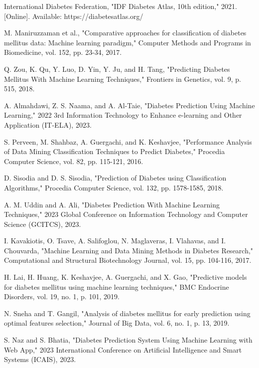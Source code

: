 \documentclass[journal]{IEEEtran}
\begin{document}
\begin{thebibliography}{00}
 International Diabetes Federation, "IDF Diabetes Atlas, 10th edition," 2021. [Online]. Available: https://diabetesatlas.org/

 M. Maniruzzaman et al., "Comparative approaches for classification of diabetes mellitus data: Machine learning paradigm," Computer Methods and Programs in Biomedicine, vol. 152, pp. 23-34, 2017.

 Q. Zou, K. Qu, Y. Luo, D. Yin, Y. Ju, and H. Tang, "Predicting Diabetes Mellitus With Machine Learning Techniques," Frontiers in Genetics, vol. 9, p. 515, 2018.

 A. Almahdawi, Z. S. Naama, and A. Al-Taie, "Diabetes Prediction Using Machine Learning," 2022 3rd Information Technology to Enhance e-learning and Other Application (IT-ELA), 2023.

 S. Perveen, M. Shahbaz, A. Guergachi, and K. Keshavjee, "Performance Analysis of Data Mining Classification Techniques to Predict Diabetes," Procedia Computer Science, vol. 82, pp. 115-121, 2016.

 D. Sisodia and D. S. Sisodia, "Prediction of Diabetes using Classification Algorithms," Procedia Computer Science, vol. 132, pp. 1578-1585, 2018.

 A. M. Uddin and A. Ali, "Diabetes Prediction With Machine Learning Techniques," 2023 Global Conference on Information Technology and Computer Science (GCITCS), 2023.

 I. Kavakiotis, O. Tsave, A. Salifoglou, N. Maglaveras, I. Vlahavas, and I. Chouvarda, "Machine Learning and Data Mining Methods in Diabetes Research," Computational and Structural Biotechnology Journal, vol. 15, pp. 104-116, 2017.

 H. Lai, H. Huang, K. Keshavjee, A. Guergachi, and X. Gao, "Predictive models for diabetes mellitus using machine learning techniques," BMC Endocrine Disorders, vol. 19, no. 1, p. 101, 2019.

 N. Sneha and T. Gangil, "Analysis of diabetes mellitus for early prediction using optimal features selection," Journal of Big Data, vol. 6, no. 1, p. 13, 2019.

 S. Naz and S. Bhatia, "Diabetes Prediction System Using Machine Learning with Web App," 2023 International Conference on Artificial Intelligence and Smart Systems (ICAIS), 2023.


\end{thebibliography}
\end{document}
